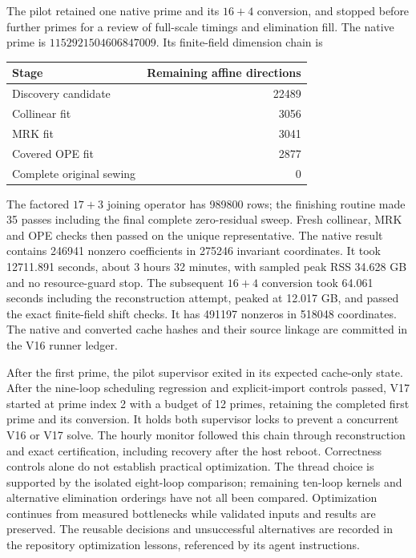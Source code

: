 \documentclass[11pt]{article}
\begin{document}
The pilot retained one native prime and its $16+4$ conversion, and stopped
before further primes for a review of full-scale timings and elimination
fill. The native prime is $1152921504606847009$. Its finite-field dimension
chain is
\begin{center}
\begin{tabular}{lr}
\toprule
Stage & Remaining affine directions\\
\midrule
Discovery candidate & 22489\\
Collinear fit & 3056\\
MRK fit & 3041\\
Covered OPE fit & 2877\\
Complete original sewing & 0\\
\bottomrule
\end{tabular}
\end{center}
The factored $17+3$ joining operator has 989800 rows; the finishing routine
made 35 passes including the final complete zero-residual sweep. Fresh
collinear, MRK and OPE checks then passed on the unique representative.
The native result contains 246941 nonzero coefficients in 275246 invariant
coordinates. It took 12711.891 seconds, about 3 hours 32 minutes, with
sampled peak RSS 34.628 GB and no resource-guard stop. The subsequent
$16+4$ conversion took 64.061 seconds including the reconstruction attempt,
peaked at 12.017 GB, and passed the exact finite-field shift checks. It has
491197 nonzeros in 518048 coordinates. The native and converted cache
hashes and their source linkage are committed in the V16 runner ledger.

After the first prime, the pilot supervisor exited in its expected
cache-only state. After the nine-loop scheduling regression and
explicit-import controls passed, V17 started at prime index 2 with a budget
of 12 primes, retaining the completed first prime and its conversion. It
holds both supervisor locks to prevent a concurrent V16 or V17 solve.
The hourly monitor followed this chain through reconstruction and exact
certification, including recovery after the host reboot. Correctness controls alone do not
establish practical optimization. The thread choice is supported by the
isolated eight-loop comparison; remaining ten-loop kernels and alternative
elimination orderings have not all been compared. Optimization continues
from measured bottlenecks while validated inputs and results are preserved.
The reusable decisions and unsuccessful alternatives are recorded in the
repository optimization lessons, referenced by its agent instructions.
\end{document}
